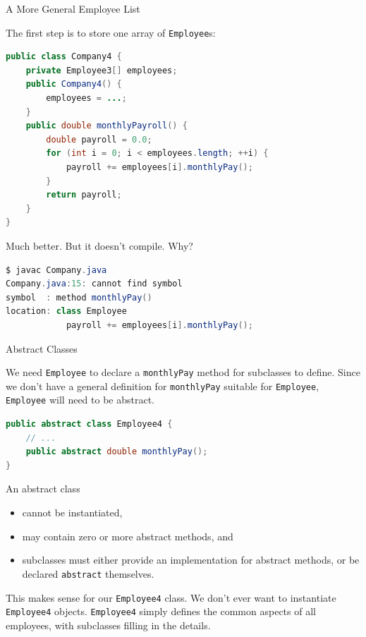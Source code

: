 \documentclass{beamer}
\begin{document}
\begin{frame}[fragile]{A More General Employee List}

\vspace{-.05in}
The first step is to store one array of {\tt Employee}s:
\vspace{-.05in}
\begin{lstlisting}[language=Java]
public class Company4 {
    private Employee3[] employees;
    public Company4() {
        employees = ...;
    }
    public double monthlyPayroll() {
        double payroll = 0.0;
        for (int i = 0; i < employees.length; ++i) {
            payroll += employees[i].monthlyPay();
        }
        return payroll;
    }
}
\end{lstlisting}
\vspace{-.05in}
Much better.  But it doesn't compile.  Why?
\vspace{-.05in}
\begin{lstlisting}[language=Java]
$ javac Company.java
Company.java:15: cannot find symbol
symbol  : method monthlyPay()
location: class Employee
            payroll += employees[i].monthlyPay();
\end{lstlisting}

\end{frame}


\begin{frame}[fragile]{Abstract Classes}


We need {\tt Employee} to declare a {\tt monthlyPay} method for subclasses to define.  Since we don't have a general definition for {\tt monthlyPay} suitable for {\tt Employee}, {\tt Employee} will need to be abstract.
\begin{lstlisting}[language=Java]
public abstract class Employee4 {
    // ...
    public abstract double monthlyPay();
}
\end{lstlisting}
An abstract class
\begin{itemize}
\item cannot be instantiated,
\item may contain zero or more abstract methods, and
\item subclasses must either provide an implementation for abstract methods, or be declared {\tt abstract} themselves.
\end{itemize}

This makes sense for our {\tt Employee4} class.  We don't ever want to instantiate {\tt Employee4} objects.  {\tt Employee4} simply defines the common aspects of all employees, with subclasses filling in the details.

\end{frame}
\end{document}
